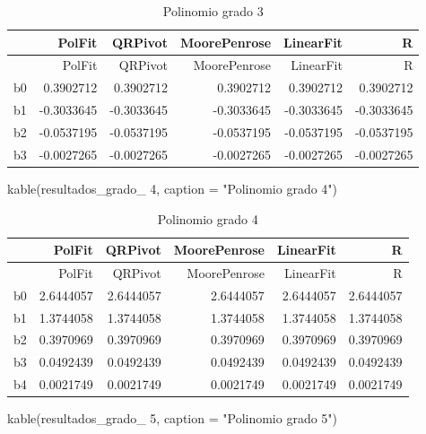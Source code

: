 \documentclass[
]{article}
\newenvironment{Shaded}{\begin{snugshade}}{\end{snugshade}}
\newcommand{\AttributeTok}[1]{\textcolor[rgb]{0.77,0.63,0.00}{#1}}
\newcommand{\FunctionTok}[1]{\textcolor[rgb]{0.00,0.00,0.00}{#1}}
\newcommand{\NormalTok}[1]{#1}
\newcommand{\StringTok}[1]{\textcolor[rgb]{0.31,0.60,0.02}{#1}}
\begin{document}
\begin{longtable}[]{@{}lrrrrr@{}}
\caption{Polinomio grado 3}\tabularnewline
\toprule
& PolFit & QRPivot & MoorePenrose & LinearFit & R \\
\midrule
\endfirsthead
\toprule
& PolFit & QRPivot & MoorePenrose & LinearFit & R \\
\midrule
\endhead
b0 & 0.3902712 & 0.3902712 & 0.3902712 & 0.3902712 & 0.3902712 \\
b1 & -0.3033645 & -0.3033645 & -0.3033645 & -0.3033645 & -0.3033645 \\
b2 & -0.0537195 & -0.0537195 & -0.0537195 & -0.0537195 & -0.0537195 \\
b3 & -0.0027265 & -0.0027265 & -0.0027265 & -0.0027265 & -0.0027265 \\
\bottomrule
\end{longtable}

\begin{Shaded}
\begin{Highlighting}[]
\FunctionTok{kable}\NormalTok{(}\StringTok{\textasciigrave{}}\AttributeTok{resultados\_grado\_ 4}\StringTok{\textasciigrave{}}\NormalTok{, }\AttributeTok{caption =} \StringTok{"Polinomio grado 4"}\NormalTok{)}
\end{Highlighting}
\end{Shaded}

\begin{longtable}[]{@{}lrrrrr@{}}
\caption{Polinomio grado 4}\tabularnewline
\toprule
& PolFit & QRPivot & MoorePenrose & LinearFit & R \\
\midrule
\endfirsthead
\toprule
& PolFit & QRPivot & MoorePenrose & LinearFit & R \\
\midrule
\endhead
b0 & 2.6444057 & 2.6444057 & 2.6444057 & 2.6444057 & 2.6444057 \\
b1 & 1.3744058 & 1.3744058 & 1.3744058 & 1.3744058 & 1.3744058 \\
b2 & 0.3970969 & 0.3970969 & 0.3970969 & 0.3970969 & 0.3970969 \\
b3 & 0.0492439 & 0.0492439 & 0.0492439 & 0.0492439 & 0.0492439 \\
b4 & 0.0021749 & 0.0021749 & 0.0021749 & 0.0021749 & 0.0021749 \\
\bottomrule
\end{longtable}

\begin{Shaded}
\begin{Highlighting}[]
\FunctionTok{kable}\NormalTok{(}\StringTok{\textasciigrave{}}\AttributeTok{resultados\_grado\_ 5}\StringTok{\textasciigrave{}}\NormalTok{, }\AttributeTok{caption =} \StringTok{"Polinomio grado 5"}\NormalTok{)}
\end{Highlighting}
\end{Shaded}
\end{document}

